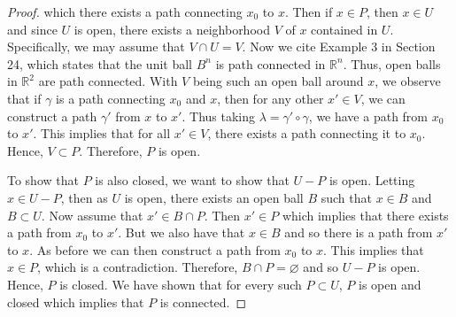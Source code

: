 \documentclass[12pt]{article}
\theoremstyle{definition}
\begin{document}
\begin{enumerate}
\begin{proof}
                which there exists a path connecting $x_0$ to $x$. Then if
                $x\in P$, then $x\in U$ and since $U$ is open, there exists
                a neighborhood $V$ of $x$ contained in $U$. Specifically, we
                may assume that $V\cap U=V$. Now we cite Example 3 in Section
                24, which states that the unit ball $B^n$ is path connected in
                $\mathbb{R}^n$. Thus, open balls in $\mathbb{R}^2$ are path
                connected. With $V$ being such an open ball around $x$, we
                observe that if $\gamma$ is a path connecting $x_0$ and $x$,
                then for any other $x'\in V$, we can construct a path $\gamma'$
                from $x$ to $x'$. Thus taking $\lambda=\gamma'\circ\gamma$, we
                have a path from $x_0$ to $x'$. This implies that for all
                $x'\in V$, there exists a path connecting it to $x_0$. Hence,
                $V\subset P$. Therefore, $P$ is open.\par\hspace{4mm} To show
                that $P$ is also closed, we want to show that $U-P$ is open.
                Letting $x\in U-P$, then as $U$ is open, there exists an open
                ball $B$ such that $x\in B$ and $B\subset U$. Now assume that
                $x'\in B\cap P$. Then $x'\in P$ which implies that there exists
                a path from $x_0$ to $x'$. But we also have that $x\in B$ and
                so there is a path from $x'$ to $x$. As before we can then
                construct a path from $x_0$ to $x$. This implies that $x\in P$,
                which is a contradiction. Therefore, $B\cap P=\varnothing$ and
                so $U-P$ is open. Hence, $P$ is closed. We have shown that for
                every such $P\subset U$, $P$ is open and closed which implies
                that $P$ is connected.
            \end{proof}
    \end{enumerate}
\end{document}
